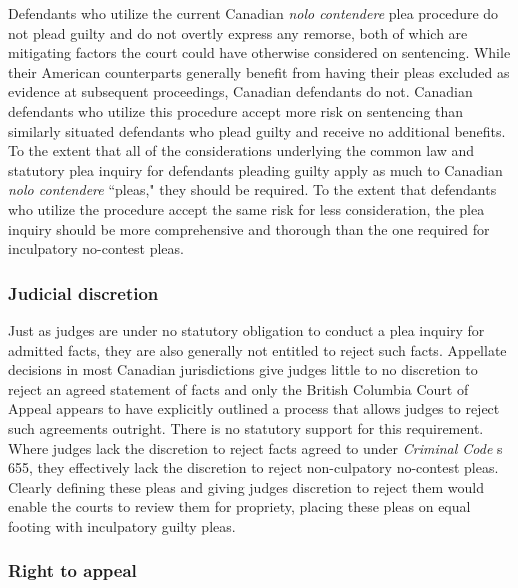 Defendants who utilize the current Canadian \textit{nolo contendere} plea procedure do not plead guilty and do not overtly express any remorse, both of which are mitigating factors the court could have otherwise considered on sentencing. While their American counterparts generally benefit from having their pleas excluded as evidence at subsequent proceedings, Canadian defendants do not. Canadian defendants who utilize this procedure accept more risk on sentencing than similarly situated defendants who plead guilty and receive no additional benefits. To the extent that all of the considerations underlying the common law and statutory plea inquiry for defendants pleading guilty apply as much to Canadian \textit{nolo contendere} ``pleas," they should be required. To the extent that defendants who utilize the procedure accept the same risk for less consideration, the plea inquiry should be more comprehensive and thorough than the one required for inculpatory no-contest pleas.

\subsubsection{Judicial discretion}

Just as judges are under no statutory obligation to conduct a plea inquiry for admitted facts, they are also generally not entitled to reject such facts. Appellate decisions in most Canadian jurisdictions give judges little to no discretion to reject an agreed statement of facts and only the British Columbia Court of Appeal appears to have explicitly outlined a process that allows judges to reject such agreements outright. There is no statutory support for this requirement. Where judges lack the discretion to reject facts agreed to under \textit{Criminal Code} s 655, they effectively lack the discretion to reject non-culpatory no-contest pleas. Clearly defining these pleas and giving judges discretion to reject them would enable the courts to review them for propriety, placing these pleas on equal footing with inculpatory guilty pleas.

\subsubsection{Right to appeal}

